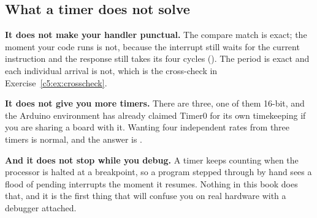 \subsection{What a timer does not solve}
\label{c5:sec:notsolve}
\textbf{It does not make your handler punctual.} The compare match is exact; the moment your code
runs is not, because the interrupt still waits for the current instruction and the response still
takes its four cycles (). The period is exact and each individual arrival
is not, which is the cross-check in Exercise~\ref{c5:ex:crosscheck}.

\textbf{It does not give you more timers.} There are three, one of them 16-bit, and the Arduino
environment has already claimed Timer0 for its own timekeeping if you are sharing a board with it.
Wanting four independent rates from three timers is normal, and the answer is
.

\textbf{And it does not stop while you debug.} A timer keeps counting when the processor is halted
at a breakpoint, so a program stepped through by hand sees a flood of pending interrupts the moment
it resumes. Nothing in this book does that, and it is the first thing that will confuse you on real
hardware with a debugger attached.
